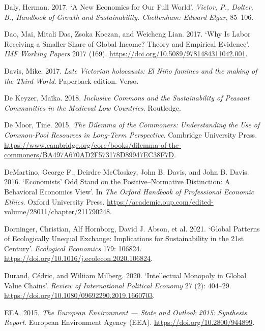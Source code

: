 \documentclass[
  british,
  a4paper,
  DIV=11,
  numbers=noendperiod,
  oneside,
  openany]{scrreprt}
\newlength{\cslhangindent}
\newenvironment{CSLReferences}[2] %
 {\begin{list}{}{%
  \setlength{\itemindent}{0pt}
  \setlength{\leftmargin}{0pt}
  \setlength{\parsep}{0pt}
  \ifodd #1
   \setlength{\leftmargin}{\cslhangindent}
   \setlength{\itemindent}{-1\cslhangindent}
  \fi
  \setlength{\itemsep}{#2\baselineskip}}}
 {\end{list}}
\begin{document}
\begin{CSLReferences}{1}{1}
Daly, Herman. 2017. {`A New Economics for Our Full World'}.
\emph{Victor, P., Dolter, B., Handbook of Growth and Sustainability.
Cheltenham: Edward Elgar}, 85--106.

Dao, Mai, Mitali Das, Zsoka Koczan, and Weicheng Lian. 2017. {`Why {Is}
{Labor} {Receiving} a {Smaller} {Share} of {Global} {Income}? {Theory}
and {Empirical} {Evidence}'}. \emph{IMF Working Papers} 2017 (169).
\url{https://doi.org/10.5089/9781484311042.001}.

Davis, Mike. 2017. \emph{Late Victorian holocausts: El Niño famines and
the making of the Third World}. Paperback edition. Verso.

De Keyzer, Maïka. 2018. \emph{Inclusive Commons and the Sustainability
of Peasant Communities in the Medieval Low Countries}. Routledge.

De Moor, Tine. 2015. \emph{The Dilemma of the Commoners: Understanding
the Use of Common-Pool Resources in Long-Term Perspective}. Cambridge
University Press.
\url{https://www.cambridge.org/core/books/dilemma-of-the-commoners/BA497A670AD2F573178D89947EC38F7D}.

DeMartino, George F., Deirdre McCloskey, John B. Davis, and John B.
Davis. 2016. {`Economists' Odd Stand on the Positive--Normative
Distinction: A Behavioral Economics View'}. In \emph{The Oxford Handbook
of Professional Economic Ethics}. Oxford University Press.
\url{https://academic.oup.com/edited-volume/28011/chapter/211790248}.

Dorninger, Christian, Alf Hornborg, David J. Abson, et al. 2021.
{`Global Patterns of Ecologically Unequal Exchange: Implications for
Sustainability in the 21st Century'}. \emph{Ecological Economics} 179:
106824. \url{https://doi.org/10.1016/j.ecolecon.2020.106824}.

Durand, Cédric, and Wiliiam Milberg. 2020. {`Intellectual Monopoly in
Global Value Chains'}. \emph{Review of International Political Economy}
27 (2): 404--29. \url{https://doi.org/10.1080/09692290.2019.1660703}.

EEA. 2015. \emph{The {European} Environment --- State and Outlook 2015:
Synthesis Report}. European Environment Agency (EEA).
\url{https://doi.org/10.2800/944899}.


\end{CSLReferences}
\end{document}
